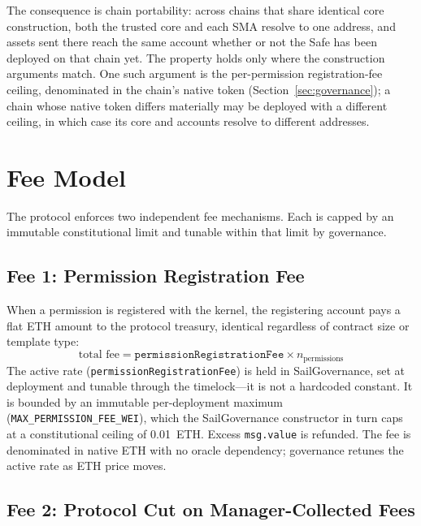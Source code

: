 \documentclass[11pt]{article}
\begin{document}
The consequence is chain portability: across chains that share identical core construction, both the trusted core and each SMA resolve to one address, and assets sent there reach the same account whether or not the Safe has been deployed on that chain yet. The property holds only where the construction arguments match. One such argument is the per-permission registration-fee ceiling, denominated in the chain's native token (Section~\ref{sec:governance}); a chain whose native token differs materially may be deployed with a different ceiling, in which case its core and accounts resolve to different addresses.

\section{Fee Model}
\label{sec:fees}

The protocol enforces two independent fee mechanisms. Each is capped by an immutable constitutional limit and tunable within that limit by governance.

\subsection{Fee 1: Permission Registration Fee}

When a permission is registered with the kernel, the registering account pays a flat ETH amount to the protocol treasury, identical regardless of contract size or template type:
\begin{equation*}
\text{total fee} = \texttt{permissionRegistrationFee} \times n_{\text{permissions}}
\end{equation*}
The active rate (\texttt{permissionRegistrationFee}) is held in SailGovernance, set at deployment and tunable through the timelock---it is not a hardcoded constant. It is bounded by an immutable per-deployment maximum (\texttt{MAX\_PERMISSION\_FEE\_WEI}), which the SailGovernance constructor in turn caps at a constitutional ceiling of 0.01~ETH. Excess \texttt{msg.value} is refunded. The fee is denominated in native ETH with no oracle dependency; governance retunes the active rate as ETH price moves.

\subsection{Fee 2: Protocol Cut on Manager-Collected Fees}
\end{document}
